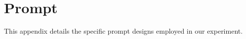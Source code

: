 

\section{Prompt}\label{appx:prompt}

This appendix details the specific prompt designs employed in our experiment.


